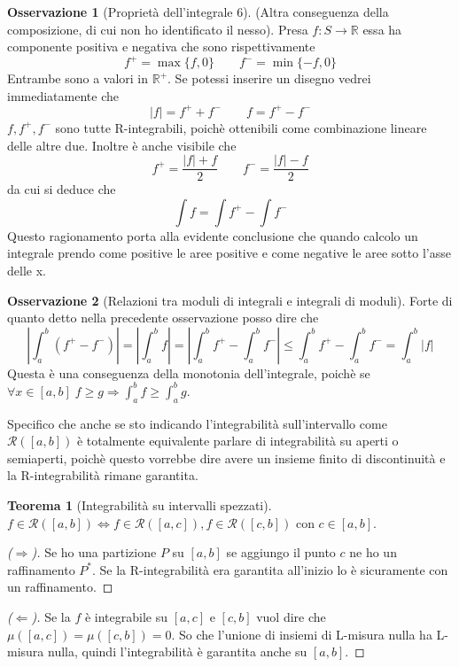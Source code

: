 \documentclass{article}
\theoremstyle{definition}
\newtheorem{theorem}{Teorema}[section]
\theoremstyle{definition}
\theoremstyle{definition}
\theoremstyle{definition}
\newtheorem{remark}{Osservazione}[section]
\theoremstyle{definition}
\begin{document}
\begin{remark}[Proprietà dell'integrale 6]
    (Altra conseguenza della composizione, di cui non ho identificato il nesso). Presa $f:S\rightarrow\mathbb{R}$ essa ha componente positiva e negativa che sono rispettivamente
    \[
        f^+=\max\lbrace f,0 \rbrace  \qquad f^-=\min\lbrace -f,0 \rbrace
    \]
    Entrambe sono a valori in $\mathbb{R}^+$. Se potessi inserire un disegno vedrei immediatamente che 
    \[
        |f|=f^++f^- \qquad f=f^+-f^-  
    \]
    $f,f^+,f^-$ sono tutte R-integrabili, poichè ottenibili come combinazione lineare delle altre due.
    Inoltre è anche visibile che
    \[
        f^+=\frac{|f|+f}{2} \qquad f^-=\frac{|f|-f}{2}
    \]
    da cui si deduce che 
    \[
        \int f = \int f^+ - \int f^-
    \]
    Questo ragionamento porta alla evidente conclusione che quando calcolo un integrale prendo come positive le aree positive e come negative le aree sotto l'asse delle x.
\end{remark}

\begin{remark}[Relazioni tra moduli di integrali e integrali di moduli]
    Forte di quanto detto nella precedente osservazione posso dire che
    \[
        \left|\int_{a}^{b}(f^+-f^-)\right| = \left|\int_{a}^{b}f\right|=\left|\int_{a}^{b}f^+-\int_{a}^{b}f^- \right| \leq \int_{a}^{b}f^+-\int_{a}^{b}f^- = \int_{a}^{b} |f|
    \]
    Questa è una conseguenza della monotonia dell'integrale, poichè se $\forall x \in [a,b] \; f \geq g \Rightarrow \int_{a}^{b}f \geq \int_{a}^{b}g$.
\end{remark}

Specifico che anche se sto indicando l'integrabilità sull'intervallo come $\mathcal{R}([a,b])$ è totalmente equivalente parlare di integrabilità su aperti o semiaperti, poichè questo vorrebbe dire avere un insieme finito di discontinuità e la R-integrabilità rimane garantita.

\begin{theorem}[Integrabilità su intervalli spezzati]
    $f\in\mathcal{R}([a,b]) \Leftrightarrow f\in\mathcal{R}([a,c]), f\in\mathcal{R}([c,b])$ con $c\in[a,b]$.
    \begin{proof}[($\Rightarrow$)]
        Se ho una partizione $P$ su $[a,b]$ se aggiungo il punto $c$ ne ho un raffinamento $P^*$. Se la R-integrabilità era garantita all'inizio lo è sicuramente con un raffinamento.
    \end{proof}
    \begin{proof}[($\Leftarrow$)]
        Se la $f$ è integrabile su $[a,c]$ e $[c,b]$ vuol dire che $\mu([a,c])=\mu([c,b])=0$. So che l'unione di insiemi di L-misura nulla ha L-misura nulla, quindi l'integrabilità è garantita anche su $[a,b]$.
    \end{proof}
\end{theorem}
\end{document}
